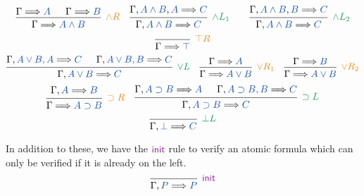 \[
  \begin{prooftree}
    \hypo{\sequent{A}}
    \hypo{\sequent{B}}
    \infer2[$\rightRule{\land R}$]{\sequent{A \land B}}
  \end{prooftree}
  \quad
  \begin{prooftree}
    \hypo{\sequent[A \land B][A]{C}}
    \infer1[$\leftRule{\land L_1}$]{\sequent[A \land B]{C}}
  \end{prooftree}
  \quad
  \quad
  \begin{prooftree}
    \hypo{\sequent[A \land B][B]{C}}
    \infer1[$\leftRule{\land L_2}$]{\sequent[A \land B]{C}}
  \end{prooftree}
\]
\vspace{0.5em}
\[
  \begin{prooftree}
    \infer0[$\rightRule{\top R}$]{\sequent{\top}}
  \end{prooftree}
\]
\vspace{0.5em}
\[
  \begin{prooftree}
    \hypo{\sequent[A \lor B, A]{C}}
    \hypo{\sequent[A \lor B, B]{C}}
    \infer2[$\leftRule{\lor L}$]{\sequent[A \lor B]{C}}
  \end{prooftree}
  \quad
  \begin{prooftree}
    \hypo{\sequent{A}}
    \infer1[$\rightRule{\vee R_1}$]{\sequent{A \lor B}}
  \end{prooftree}
  \quad
  \begin{prooftree}
    \hypo{\sequent{B}}
    \infer1[$\rightRule{\vee R_2}$]{\sequent{A \lor B}}
  \end{prooftree}
\]
\vspace{0.5em}
\[
  \begin{prooftree}
    \hypo{\sequent[A]{B}}
    \infer1[$\rightRule{\supset R}$]{\sequent{A \supset B}}
  \end{prooftree}
  \quad
  \begin{prooftree}
    \hypo{\sequent[A \supset B]{A}}
    \hypo{\sequent[A \supset B, B]{C}}
    \infer2[$\leftRule{\supset L}$]{\sequent[A \supset B]{C}}
  \end{prooftree}
\]
\vspace{0.5em}
\[
  \begin{prooftree}
    \infer0[$\leftRule{\bot L}$]{\sequent[\bot]{C}}
  \end{prooftree}
\]

In addition to these, we have the $\initRule$ rule to verify an atomic formula
which can only be verified if it is already on the left.
\[
  \begin{prooftree}
    \infer0[$\initRule$]{\sequent[P]{P}}
  \end{prooftree}
\]

